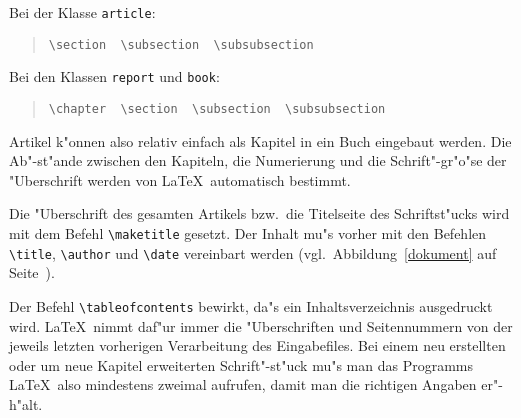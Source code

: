 \pagebreak[3] %
\noindent Bei der Klasse \texttt{article}:
\begin{quote}
\verb|\section  \subsection  \subsubsection|
\end{quote}
Bei den Klassen \texttt{report} und \texttt{book}:
\begin{quote}
\verb|\chapter  \section  \subsection  \subsubsection|
\end{quote}
Artikel k"onnen also relativ einfach als Kapitel in ein Buch
eingebaut werden.  Die Ab"-st"ande zwischen den Kapiteln, die
Numerierung und die Schrift"-gr"o"se der "Uberschrift werden von
\LaTeX\ automatisch bestimmt.



Die "Uberschrift des gesamten Artikels bzw.\ die Titelseite des
Schrift\-st"ucks wird mit dem Befehl \verb|\maketitle| gesetzt.
Der Inhalt mu"s vorher mit den Befehlen \verb|\title|,
\verb|\author| und \verb|\date| vereinbart werden (vgl.\ 
Abbildung~\ref{dokument} auf Seite~\pageref{dokument}).

 
Der Befehl \verb|\tableofcontents| bewirkt, da"s ein
Inhaltsverzeichnis ausgedruckt wird.
\LaTeX\ nimmt daf"ur immer die "Uberschriften und Seitennummern
von der jeweils letzten vorherigen Verarbeitung des Eingabefiles.
Bei einem neu erstellten oder um neue Kapitel erweiterten
Schrift"-st"uck mu"s man das Programms \LaTeX\ also mindestens
zweimal aufrufen, damit man die richtigen Angaben er"-h"alt.
 
